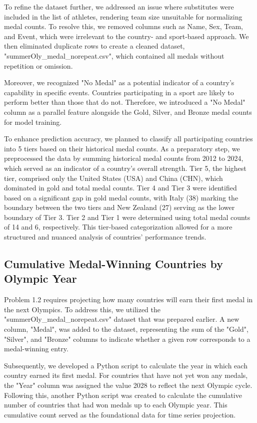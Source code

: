 \documentclass{mcmthesis}
\begin{document}
To refine the dataset further, we addressed an issue where substitutes were included in the list of athletes, rendering team size unsuitable for normalizing medal counts. To resolve this, we removed columns such as Name, Sex, Team, and Event, which were irrelevant to the country- and sport-based approach. We then eliminated duplicate rows to create a cleaned dataset, "summerOly\_medal\_norepeat.csv", which contained all medals without repetition or omission.

Moreover, we recognized "No Medal" as a potential indicator of a country's capability in specific events. Countries participating in a sport are likely to perform better than those that do not. Therefore, we introduced a "No Medal" column as a parallel feature alongside the Gold, Silver, and Bronze medal counts for model training.

To enhance prediction accuracy, we planned to classify all participating countries into 5 tiers based on their historical medal counts. As a preparatory step, we preprocessed the data by summing historical medal counts from 2012 to 2024, which served as an indicator of a country's overall strength. Tier 5, the highest tier, comprised only the United States (USA) and China (CHN), which dominated in gold and total medal counts. Tier 4 and Tier 3 were identified based on a significant gap in gold medal counts, with Italy (38) marking the boundary between the two tiers and New Zealand (27) serving as the lower boundary of Tier 3. Tier 2 and Tier 1 were determined using total medal counts of 14 and 6, respectively. This tier-based categorization allowed for a more structured and nuanced analysis of countries' performance trends.

\subsection{Cumulative Medal-Winning Countries by Olympic Year}
Problem 1.2 requires projecting how many countries will earn their first medal in the next Olympics. To address this, we utilized the "summerOly\_medal\_norepeat.csv" dataset that was prepared earlier. A new column, "Medal", was added to the dataset, representing the sum of the "Gold", "Silver", and "Bronze" columns to indicate whether a given row corresponds to a medal-winning entry.

Subsequently, we developed a Python script to calculate the year in which each country earned its first medal. For countries that have not yet won any medals, the "Year" column was assigned the value 2028 to reflect the next Olympic cycle. Following this, another Python script was created to calculate the cumulative number of countries that had won medals up to each Olympic year. This cumulative count served as the foundational data for time series projection.
\end{document}
